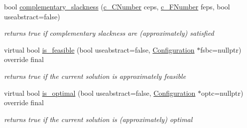 \begin{Indent}
\begin{DoxyCompactItemize}
bool \mbox{\hyperlink{class_s_m_spp__di__unipi__it_1_1_m_c_f_block_a7c6d8d4ff78950993ded5d1abfd4fe53}{complementary\+\_\+slackness}} (\mbox{\hyperlink{class_s_m_spp__di__unipi__it_1_1_m_c_f_block_a8e47cae4e16e180273d262aae769a854}{c\+\_\+\+C\+Number}} ceps, \mbox{\hyperlink{class_s_m_spp__di__unipi__it_1_1_m_c_f_block_a956c123a5a6b2b52f033ca1987acd80e}{c\+\_\+\+F\+Number}} feps, bool useabstract=false)
\begin{DoxyCompactList}\small\item\em returns true if complementary slackness are (approximately) satisfied \end{DoxyCompactList}\item 
virtual bool \mbox{\hyperlink{class_s_m_spp__di__unipi__it_1_1_m_c_f_block_a162cd7d8375d705f0b15d8e847098763}{is\+\_\+feasible}} (bool useabstract=false, \mbox{\hyperlink{class_s_m_spp__di__unipi__it_1_1_configuration}{Configuration}} $\ast$fsbc=nullptr) override final
\begin{DoxyCompactList}\small\item\em returns true if the current solution is approximately feasible \end{DoxyCompactList}\item 
virtual bool \mbox{\hyperlink{class_s_m_spp__di__unipi__it_1_1_m_c_f_block_a0b1e7ff87a97e692c97f52f096f6eb50}{is\+\_\+optimal}} (bool useabstract=false, \mbox{\hyperlink{class_s_m_spp__di__unipi__it_1_1_configuration}{Configuration}} $\ast$optc=nullptr) override final
\begin{DoxyCompactList}\small\item\em returns true if the current solution is (approximately) optimal \end{DoxyCompactList}\end{DoxyCompactItemize}
\end{Indent}
